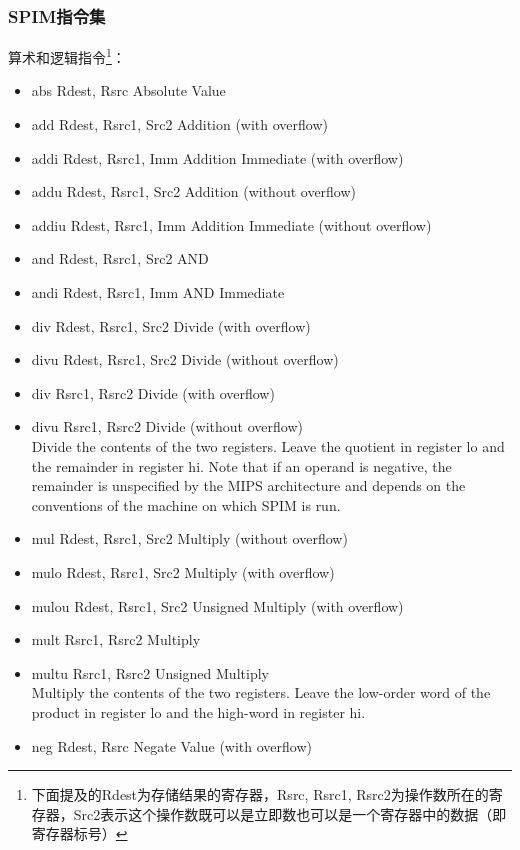 \documentclass[a4paper, 11pt]{article}
\begin{document}
\subsubsection{SPIM指令集}
	算术和逻辑指令\footnote{下面提及的Rdest为存储结果的寄存器，Rsrc, Rsrc1, Rsrc2为操作数所在的寄存器，Src2表示这个操作数既可以是立即数也可以是一个寄存器中的数据（即寄存器标号）}：
	\begin{itemize}
		\item abs Rdest, Rsrc	\hfill Absolute Value
		\item add Rdest, Rsrc1, Src2	\hfill Addition (with overflow)
		\item addi Rdest, Rsrc1, Imm	\hfill Addition Immediate (with overflow)
		\item addu Rdest, Rsrc1, Src2	\hfill Addition (without overflow)
		\item addiu Rdest, Rsrc1, Imm	\hfill Addition Immediate (without overflow)
		\item and Rdest, Rsrc1, Src2	\hfill AND
		\item andi Rdest, Rsrc1, Imm	\hfill AND Immediate
		\item div Rdest, Rsrc1, Src2	\hfill Divide (with overflow)
		\item divu Rdest, Rsrc1, Src2	\hfill Divide (without overflow)
		\item div Rsrc1, Rsrc2	\hfill Divide (with overflow)
		\item divu Rsrc1, Rsrc2	\hfill Divide (without overflow)\\
			Divide the contents of the two registers. Leave the quotient in register lo and the remainder in register hi. Note that if an operand is negative, the remainder is unspecified by the MIPS architecture and depends on the conventions of the machine on which SPIM is run.
		\item mul Rdest, Rsrc1, Src2	\hfill Multiply (without overflow)
		\item mulo Rdest, Rsrc1, Src2	\hfill Multiply (with overflow)
		\item mulou Rdest, Rsrc1, Src2	\hfill Unsigned Multiply (with overflow)
		\item mult Rsrc1, Rsrc2	\hfill Multiply
		\item multu Rsrc1, Rsrc2	\hfill Unsigned Multiply\\
			Multiply the contents of the two registers. Leave the low-order word of the product in register lo and the high-word in register hi.
		\item neg Rdest, Rsrc	\hfill Negate Value (with overflow)

\end{itemize}
\end{document}
